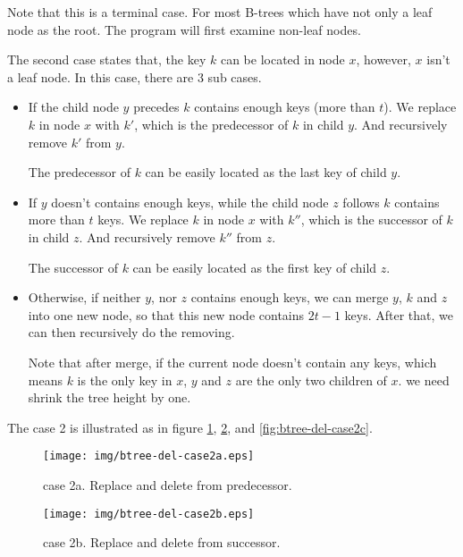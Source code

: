 \documentclass{article}
\begin{document}
Note that this is a terminal case. For most B-trees which have
not only a leaf node as the root. The program will first examine
non-leaf nodes.

The second case states that, the key $k$ can be located in node $x$,
however, $x$ isn't a leaf node. In this case, there are 3 sub cases.

\begin{itemize}
\item If the child node $y$ precedes $k$ contains enough keys (more than $t$).
We replace $k$ in node $x$ with $k'$, which is
the predecessor of $k$ in child $y$. And recursively remove $k'$
from $y$.

The predecessor of $k$ can be easily located as the last key of child
$y$.

\item If $y$ doesn't contains enough keys, while the child node $z$
follows $k$ contains more than $t$ keys. We replace $k$ in node $x$
with $k''$, which is the successor of $k$ in child $z$. And recursively
remove $k''$ from $z$.

The successor of $k$ can be easily located as the first key of child $z$.

\item Otherwise, if neither $y$, nor $z$ contains enough keys, we
can merge $y$, $k$ and $z$ into one new node, so that this new node
contains $2t-1$ keys. After that, we can then recursively do the removing.

Note that after merge, if the current node doesn't contain any keys,
which means $k$ is the only key in $x$, $y$ and $z$ are the only two
children of $x$. we need shrink the tree height by one.
\end{itemize}

The case 2 is illustrated as in figure \ref{fig:btree-del-case2a},
\ref{fig:btree-del-case2b}, and \ref{fig:btree-del-case2c}.

\begin{figure}[htbp]
  \begin{center}
    \texttt{[image: img/btree-del-case2a.eps]}
    \caption{case 2a. Replace and delete from predecessor.} \label{fig:btree-del-case2a}
  \end{center}
\end{figure}

\begin{figure}[htbp]
  \begin{center}
    \texttt{[image: img/btree-del-case2b.eps]}
    \caption{case 2b. Replace and delete from successor.} \label{fig:btree-del-case2b}
  \end{center}
\end{figure}
\end{document}
